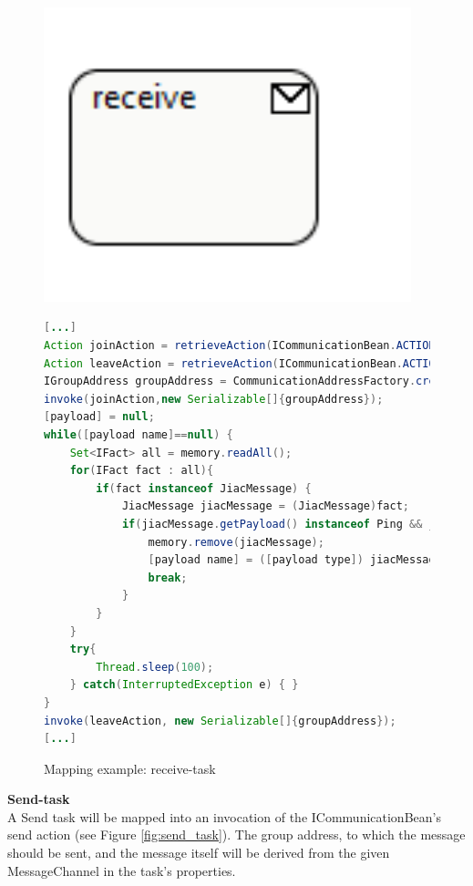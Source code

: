 \begin{figure}[h]
\begin{minipage}[c]{0.3\textwidth}
\includegraphics[width=0.95\textwidth]{images/mapping/receiveTask.png}
\end{minipage}
\begin{minipage}[c]{0.7\textwidth}
\begin{lstlisting}[language=Java]
[...]
Action joinAction = retrieveAction(ICommunicationBean.ACTION_JOIN_GROUP);
Action leaveAction = retrieveAction(ICommunicationBean.ACTION_LEAVE_GROUP);
IGroupAddress groupAddress = CommunicationAddressFactory.createGroupAddress([address]);
invoke(joinAction,new Serializable[]{groupAddress});
[payload] = null;
while([payload name]==null) {
	Set<IFact> all = memory.readAll();
	for(IFact fact : all){
		if(fact instanceof JiacMessage) {
			JiacMessage jiacMessage = (JiacMessage)fact;
			if(jiacMessage.getPayload() instanceof Ping && jiacMessage.getHeader(IJiacMessage.Header.SEND_TO).equals(groupAddress)) {
				memory.remove(jiacMessage);
				[payload name] = ([payload type]) jiacMessage.getPayload();
				break;
			}
		}
	}
	try{
		Thread.sleep(100);
	} catch(InterruptedException e) { }
}
invoke(leaveAction, new Serializable[]{groupAddress});
[...]
\end{lstlisting}
\end{minipage}
\caption{Mapping example: receive-task}%
\label{fig:receive_task}%
\end{figure}

\textbf{Send-task}\\
A Send task will be mapped into an invocation of the ICommunicationBean's send action (see Figure \ref{fig:send_task}). The group address, to which the message should be sent, and the message itself will be derived from the given MessageChannel in the task's properties. \\\\
 
